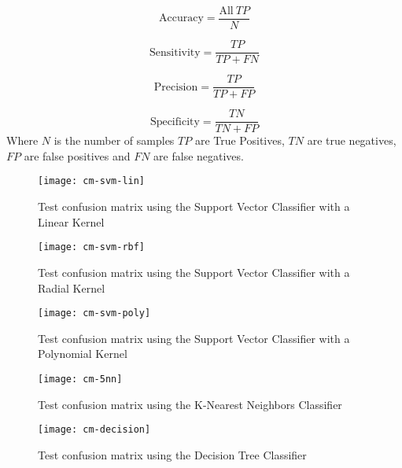 \begin{equation}
    \text{Accuracy} = \frac{\text{All} \: TP}{N}
\end{equation}

\begin{equation}
    \text{Sensitivity} = \frac{TP}{TP + FN}
\end{equation}

\begin{equation}
    \text{Precision} = \frac{TP}{TP + FP}
\end{equation}

\begin{equation}
    \text{Specificity} = \frac{TN}{TN + FP}
\end{equation}
Where $N$ is the number of samples $TP$ are True Positives, 
$TN$ are true negatives, $FP$ are false positives and $FN$ are false negatives.

\begin{figure}[ht]
    \centering
    \texttt{[image: cm-svm-lin]}
    \caption{Test confusion matrix using the Support Vector Classifier with a Linear Kernel}
    \label{fig:cm-svm-lin}
\end{figure}


\begin{figure}[ht]
    \centering
    \texttt{[image: cm-svm-rbf]}
    \caption{Test confusion matrix using the Support Vector Classifier with a Radial Kernel}
    \label{fig:cm-svm-rbf}
\end{figure}

\begin{figure}[ht]
    \centering
    \texttt{[image: cm-svm-poly]}
    \caption{Test confusion matrix using the Support Vector Classifier with a Polynomial Kernel}
    \label{fig:cm-svm-poly}
\end{figure}

\begin{figure}[ht]
    \centering
    \texttt{[image: cm-5nn]}
    \caption{Test confusion matrix using the K-Nearest Neighbors Classifier}
    \label{fig:cm-5nn}
\end{figure}

\begin{figure}[ht]
    \centering
    \texttt{[image: cm-decision]}
    \caption{Test confusion matrix using the Decision Tree Classifier}
    \label{fig:cm-decision}
\end{figure}

